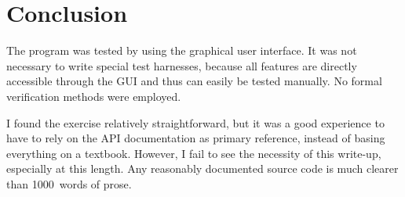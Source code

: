 \documentclass[11pt]{article}
\begin{document}
\section{Conclusion}
The program was tested by using the graphical user interface. It was not
necessary to write special test harnesses, because all features are directly
accessible through the GUI and thus can easily be tested manually.
No formal verification methods were employed.

I found the exercise relatively straightforward, but it was a good experience
to have to rely on the API documentation as primary reference, instead of
basing everything on a textbook. However, I fail to see the necessity of this
write-up, especially at this length. Any reasonably documented source code
is much clearer than 1000~words of prose.
\end{document}
